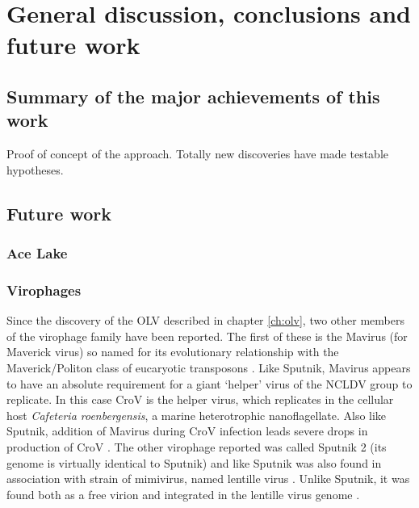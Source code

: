 \chapter{General discussion, conclusions and future work}
\label{ch:conc}
\acresetall

\section{Summary of the major achievements of this work}

Proof of concept of the approach.
Totally new discoveries have made testable hypotheses.

\section{Future work}
\subsection{Ace Lake}

\subsection{Virophages}
Since the discovery of the \ac{OLV} \cite{Yau2011} described in chapter \ref{ch:olv}, two other members of the virophage family have been reported.
The first of these is the Mavirus (for Maverick virus) so named for its evolutionary relationship with the Maverick/Politon class of eucaryotic transposons \cite{Fischer2011}.
Like Sputnik, Mavirus appears to have an absolute requirement for a giant `helper' virus of the \ac{NCLDV} group to replicate.
In this case \ac{CroV} is the helper virus, which replicates in the cellular host \emph{Cafeteria roenbergensis}, a marine heterotrophic nanoflagellate. 
Also like Sputnik, addition of Mavirus during \ac{CroV} infection leads severe drops in production of \ac{CroV} \cite{Fischer2011}.
The other virophage reported was called Sputnik 2 (its genome is virtually identical to Sputnik) and like Sputnik was also found in association with strain of mimivirus, named lentille virus \cite{Desnues2012}.
Unlike Sputnik, it was found both as a free virion and integrated in the lentille virus genome \cite{Desnues2012}.

